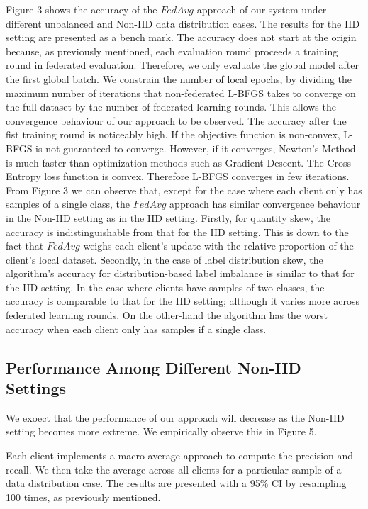 \documentclass[letterpaper]{article} %
\begin{document}
Figure 3 shows the accuracy of the $FedAvg$ approach of our system under different unbalanced and Non-IID data distribution cases. The results for the IID setting are presented as a bench mark. The accuracy does not start at the origin because, as previously mentioned, each evaluation round proceeds a training round in federated evaluation. Therefore, we only evaluate the global model after the first global batch. We constrain the number of local epochs, by dividing the maximum number of iterations that non-federated L-BFGS takes to converge on the full dataset by the number of federated learning rounds. This allows the convergence behaviour of our approach to be observed. The accuracy after the fist training round is noticeably high. If the objective function is non-convex, L-BFGS is not guaranteed to converge. However, if it converges, Newton's Method is much faster than optimization methods such as Gradient Descent. The Cross Entropy loss function is convex. Therefore L-BFGS converges in few iterations. From Figure 3 we can observe that, except for the case where each client only has samples of a single class, the $FedAvg$ approach has similar convergence behaviour in the Non-IID setting as in the IID setting. Firstly, for quantity skew, the accuracy is indistinguishable from that for the IID setting. This is down to the fact that $FedAvg$ weighs each client's update with the relative proportion of the client's local dataset. Secondly, in the case of label distribution skew, the algorithm's accuracy for distribution-based label imbalance is similar to that for the IID setting. In the case where clients have samples of two classes, the accuracy is comparable to that for the IID setting; although it varies more across federated learning rounds. On the other-hand the algorithm has the worst accuracy when each client only has samples if a single class.

\subsection{Performance Among Different Non-IID Settings}

We exoect that the performance of our approach will decrease as the Non-IID setting becomes more extreme. We empirically observe this in Figure 5. 

Each client implements a macro-average approach to compute the precision and recall. We then take the average across all clients for a particular sample of a data distribution case. The results are presented with a 95\% CI by resampling 100 times, as previously mentioned.
\end{document}
